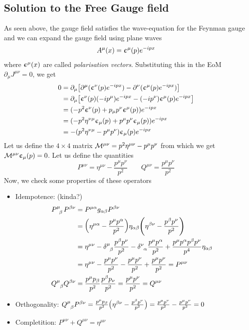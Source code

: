 \subsection{Solution to the Free Gauge field}
As seen above, the gauge field satisfies the wave-equation for the Feynman gauge and we can expand the gauge field using plane waves
$$A^\mu(x) = \upepsilon^{\mu}(p)e^{-ipx}$$
where $\upepsilon^{\mu}(x)$ are called \textit{polarisation vectors}. Substituting this in the EoM $\partial_\mu J^{\mu\nu} =0$, we get
\begin{align*}
    0 &= \partial_\mu \qty[\partial^{\mu} (\upepsilon^{\nu}(p)e^{-ipx}) - \partial^{\nu} (\upepsilon^{\mu}(p)e^{-ipx})]\\
    &=\partial_\mu \qty[\upepsilon^{\nu}(p) (-ip^\mu )e^{-ipx} -(-ip^\nu) \upepsilon^{\mu}(p)e^{-ipx}]\\
    &=(-p^2\upepsilon^{\nu}(p) + p_\mu p^\nu \upepsilon^{\mu}(p))e^{-ipx}\\
    &=(-p^2\eta^{\nu \mu}\upepsilon_{\mu}(p) + p^\mu p^\nu \upepsilon_{\mu}(p))e^{-ipx}\\
    &=-(p^2\eta^{\nu \mu} - p^\mu p^\nu )\upepsilon_{\mu}(p)e^{-ipx}
\end{align*}
Let us define the $4\times 4$ matrix $\mathcal M^{\mu\nu} = p^2 \eta^{\mu\nu}-p^\mu p^\nu$ from which we get $\mathcal M^{\mu\nu}\upepsilon_{\mu}(p) =0$. Let us define the quantities
$$P^{\mu\nu} =\eta^{\mu\nu} - \frac{p^\mu p^\nu}{p^2}\qquad Q^{\mu\nu} = \frac{p^\mu p^\nu}{p^2}$$
Now, we check some properties of these operators
\begin{itemize}
    \item[$\vartriangleright$] Idempotence: (kinda?) \begin{align*}
        \tensor{P}{^\mu _\beta} P^{\beta \nu} &=  \tensor{P}{^\mu ^\alpha}g_{\alpha\beta} P^{\beta \nu} \\
        &=\qty(\eta^{\mu\alpha} - \frac{p^\mu p^\alpha}{p^2})\eta_{\alpha\beta}\qty(\eta^{\beta\nu} - \frac{p^\beta p^\nu}{p^2})\\
        &=\eta^{\mu\nu} -\tensor{\delta}{^\mu _\beta}\frac{p^\beta p^\nu}{p^2} -\tensor{\delta}{^\nu _\alpha}\frac{p^\mu p^\alpha}{p^2}+\frac{p^\mu p^\alpha p^\beta  p^\nu}{p^4}\eta_{\alpha\beta}\\
        &=\eta^{\mu\nu} -\frac{p^\mu p^\nu}{p^2} - \frac{p^\mu p^\nu}{p^2} +  \frac{p^\mu p^\nu}{p^2} = P^{\mu\nu}\\
        \tensor{Q}{^\mu _\beta} Q^{\beta \nu} &= \frac{p^\mu p_\beta}{p^2}\frac{p^\beta p_\nu}{p^2} = \frac{p^\mu p^\nu}{p^2} = Q^{\mu\nu}
    \end{align*}
    \item[$\vartriangleright$] Orthogonality: $
         \tensor{Q}{^\mu _\beta} P^{\beta \nu} = \frac{p^\mu p_\beta}{p^2}\qty(\eta^{\beta\nu} - \frac{p^\beta p^\nu}{p^2}) = \frac{p^\mu p^\nu}{p^2} - \frac{p^\mu p^\nu}{p^2} = 0$
     \item[$\vartriangleright$] Completition: $P^{\mu\nu} + Q^{\mu\nu} = \eta^{\mu\nu}$    
\end{itemize}

